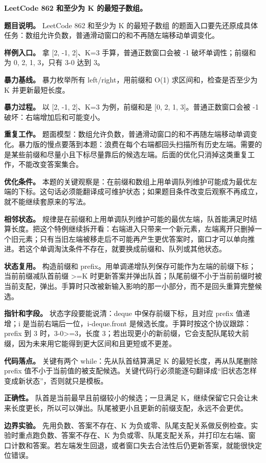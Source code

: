 \noindent\textbf{LeetCode 862 和至少为 K 的最短子数组。}

\textbf{题目说明。} LeetCode 862 和至少为 K 的最短子数组 的题面入口要先还原成具体任务：数组允许负数，普通滑动窗口的和不再随左端移动单调变化。

\textbf{样例入口。} 拿 [2, -1, 2]、K=3 手算，普通正数窗口会被 -1 破坏单调性；前缀和为 0, 2, 1, 3，只有 3-0 达到 3。

\textbf{暴力基线。} 暴力枚举所有 left/right，用前缀和 O(1) 求区间和，检查是否至少为 K 并更新最短长度。

\textbf{暴力过程。} 以 [2, -1, 2]、K=3 为例，前缀和是 [0, 2, 1, 3]。普通正数窗口会被 -1 破坏：右端增加后和可能变小。

\textbf{重复工作。} 题面模型：数组允许负数，普通滑动窗口的和不再随左端移动单调变化。暴力版的慢点要落到本题：浪费在每个右端都回头扫描所有历史左端。需要的是某些前缀和尽量小且下标尽量靠后的候选左端。后面的优化只消掉这类重复工作，不能改变答案集合。

\textbf{优化条件。} 本题的关键观察是：在前缀和数组上用单调队列维护可能成为最优左端的下标。这句话必须能翻译成可维护状态；如果题目条件改变后观察不再成立，就不能继续套原来的写法。

\textbf{相邻状态。} 规律是在前缀和上用单调队列维护可能的最优左端，队首能满足时结算长度。把这个特例继续拆开看：右端进入只带来一个新元素，左端离开只删掉一个旧元素；只有当旧左端被移走后不可能再产生更优答案时，窗口才可以单向推进。若这个单调淘汰条件不存在，就要换成前缀和、队列或其他状态。

\textbf{状态复用。} 构造前缀和 prefix。用单调递增队列保存可能作为左端的前缀下标；当前前缀减队首前缀 >=K 时更新答案并弹出队首；队尾前缀不小于当前前缀时被当前支配，弹出。手算时只改被新输入影响的那一小部分，而不是回头重算完整候选。

\textbf{指针和字段。} 状态字段要能说清：deque 中保存前缀下标，且对应 prefix 值递增；i 是当前右端后一位，i-deque.front 是候选长度。手算时按这个协议跟踪：prefix 到 3 时，3-0>=3，长度 3；若出现更小的新前缀，它会支配队尾较大前缀，因为未来用它能得到更大区间和且更短或不更差。

\textbf{代码落点。} 关键有两个 while：先从队首结算满足 K 的最短长度，再从队尾删除 prefix 值不小于当前值的被支配候选。关键代码行必须能逐句翻译成“旧状态怎样变成新状态”，否则就只是模板。

\textbf{正确性。} 队首是当前最早且前缀较小的候选；一旦满足 K，继续保留它只会让未来长度更长，所以可以弹出。队尾被更小且更新的前缀支配，永远不会更优。

\textbf{边界实验。} 先用负数、答案不存在、K 为负或零、队尾支配关系做反例检查。实验时重点跑负数、答案不存在、K 为负或零、队尾支配关系，并打印左右端、窗口计数和答案。若左端发生回退，或者窗口失去合法性后仍更新答案，就能很快定位错误。

